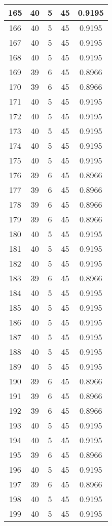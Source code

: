 \documentclass[letterpaper, 12pt]{article}
\begin{document}
\begin{longtable}{|c|c|c|c|c|}
\hline
165 & 40 & 5 & 45 & 0.9195 \\
\hline
166 & 40 & 5 & 45 & 0.9195 \\
\hline
167 & 40 & 5 & 45 & 0.9195 \\
\hline
168 & 40 & 5 & 45 & 0.9195 \\
\hline
169 & 39 & 6 & 45 & 0.8966 \\
\hline
170 & 39 & 6 & 45 & 0.8966 \\
\hline
171 & 40 & 5 & 45 & 0.9195 \\
\hline
172 & 40 & 5 & 45 & 0.9195 \\
\hline
173 & 40 & 5 & 45 & 0.9195 \\
\hline
174 & 40 & 5 & 45 & 0.9195 \\
\hline
175 & 40 & 5 & 45 & 0.9195 \\
\hline
176 & 39 & 6 & 45 & 0.8966 \\
\hline
177 & 39 & 6 & 45 & 0.8966 \\
\hline
178 & 39 & 6 & 45 & 0.8966 \\
\hline
179 & 39 & 6 & 45 & 0.8966 \\
\hline
180 & 40 & 5 & 45 & 0.9195 \\
\hline
181 & 40 & 5 & 45 & 0.9195 \\
\hline
182 & 40 & 5 & 45 & 0.9195 \\
\hline
183 & 39 & 6 & 45 & 0.8966 \\
\hline
184 & 40 & 5 & 45 & 0.9195 \\
\hline
185 & 40 & 5 & 45 & 0.9195 \\
\hline
186 & 40 & 5 & 45 & 0.9195 \\
\hline
187 & 40 & 5 & 45 & 0.9195 \\
\hline
188 & 40 & 5 & 45 & 0.9195 \\
\hline
189 & 40 & 5 & 45 & 0.9195 \\
\hline
190 & 39 & 6 & 45 & 0.8966 \\
\hline
191 & 39 & 6 & 45 & 0.8966 \\
\hline
192 & 39 & 6 & 45 & 0.8966 \\
\hline
193 & 40 & 5 & 45 & 0.9195 \\
\hline
194 & 40 & 5 & 45 & 0.9195 \\
\hline
195 & 39 & 6 & 45 & 0.8966 \\
\hline
196 & 40 & 5 & 45 & 0.9195 \\
\hline
197 & 39 & 6 & 45 & 0.8966 \\
\hline
198 & 40 & 5 & 45 & 0.9195 \\
\hline
199 & 40 & 5 & 45 & 0.9195 \\
\hline
\end{longtable}
\end{document}
